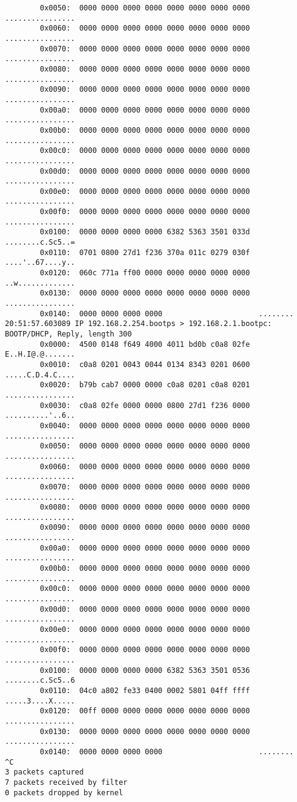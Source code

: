 \documentclass{mwart} %
\begin{document}
\begin{footnotesize}
\begin{verbatim}
        0x0050:  0000 0000 0000 0000 0000 0000 0000 0000  ................
        0x0060:  0000 0000 0000 0000 0000 0000 0000 0000  ................
        0x0070:  0000 0000 0000 0000 0000 0000 0000 0000  ................
        0x0080:  0000 0000 0000 0000 0000 0000 0000 0000  ................
        0x0090:  0000 0000 0000 0000 0000 0000 0000 0000  ................
        0x00a0:  0000 0000 0000 0000 0000 0000 0000 0000  ................
        0x00b0:  0000 0000 0000 0000 0000 0000 0000 0000  ................
        0x00c0:  0000 0000 0000 0000 0000 0000 0000 0000  ................
        0x00d0:  0000 0000 0000 0000 0000 0000 0000 0000  ................
        0x00e0:  0000 0000 0000 0000 0000 0000 0000 0000  ................
        0x00f0:  0000 0000 0000 0000 0000 0000 0000 0000  ................
        0x0100:  0000 0000 0000 0000 6382 5363 3501 033d  ........c.Sc5..=
        0x0110:  0701 0800 27d1 f236 370a 011c 0279 030f  ....'..67....y..
        0x0120:  060c 771a ff00 0000 0000 0000 0000 0000  ..w.............
        0x0130:  0000 0000 0000 0000 0000 0000 0000 0000  ................
        0x0140:  0000 0000 0000 0000                      ........
20:51:57.603089 IP 192.168.2.254.bootps > 192.168.2.1.bootpc: BOOTP/DHCP, Reply, length 300
        0x0000:  4500 0148 f649 4000 4011 bd0b c0a8 02fe  E..H.I@.@.......
        0x0010:  c0a8 0201 0043 0044 0134 8343 0201 0600  .....C.D.4.C....
        0x0020:  b79b cab7 0000 0000 c0a8 0201 c0a8 0201  ................
        0x0030:  c0a8 02fe 0000 0000 0800 27d1 f236 0000  ..........'..6..
        0x0040:  0000 0000 0000 0000 0000 0000 0000 0000  ................
        0x0050:  0000 0000 0000 0000 0000 0000 0000 0000  ................
        0x0060:  0000 0000 0000 0000 0000 0000 0000 0000  ................
        0x0070:  0000 0000 0000 0000 0000 0000 0000 0000  ................
        0x0080:  0000 0000 0000 0000 0000 0000 0000 0000  ................
        0x0090:  0000 0000 0000 0000 0000 0000 0000 0000  ................
        0x00a0:  0000 0000 0000 0000 0000 0000 0000 0000  ................
        0x00b0:  0000 0000 0000 0000 0000 0000 0000 0000  ................
        0x00c0:  0000 0000 0000 0000 0000 0000 0000 0000  ................
        0x00d0:  0000 0000 0000 0000 0000 0000 0000 0000  ................
        0x00e0:  0000 0000 0000 0000 0000 0000 0000 0000  ................
        0x00f0:  0000 0000 0000 0000 0000 0000 0000 0000  ................
        0x0100:  0000 0000 0000 0000 6382 5363 3501 0536  ........c.Sc5..6
        0x0110:  04c0 a802 fe33 0400 0002 5801 04ff ffff  .....3....X.....
        0x0120:  00ff 0000 0000 0000 0000 0000 0000 0000  ................
        0x0130:  0000 0000 0000 0000 0000 0000 0000 0000  ................
        0x0140:  0000 0000 0000 0000                      ........
^C
3 packets captured
7 packets received by filter
0 packets dropped by kernel
\end{verbatim}
\end{footnotesize}
\end{document}
